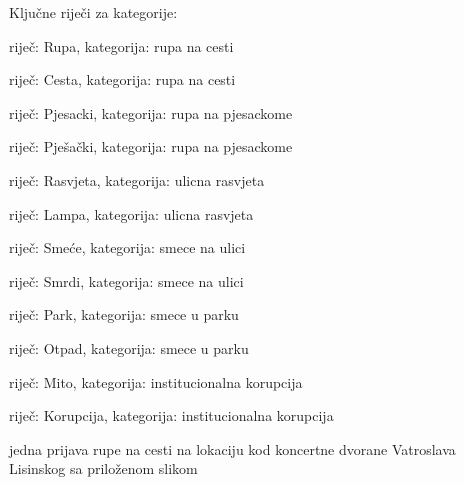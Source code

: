 \begin{packed_item}
\begin{packed_item}
				\end{packed_item}
				\item Ključne riječi za kategorije:
				\begin{packed_item}
					\item riječ: Rupa, kategorija: rupa na cesti
					\item riječ: Cesta, kategorija: rupa na cesti
					\item riječ: Pjesacki, kategorija: rupa na pjesackome
					\item riječ: Pješački, kategorija: rupa na pjesackome
					\item riječ: Rasvjeta, kategorija: ulicna rasvjeta
					\item riječ: Lampa, kategorija: ulicna rasvjeta
					\item riječ: Smeće, kategorija: smece na ulici
					\item riječ: Smrdi, kategorija: smece na ulici
					\item riječ: Park, kategorija: smece u parku
					\item riječ: Otpad, kategorija: smece u parku
					\item riječ: Mito, kategorija: institucionalna korupcija
					\item riječ: Korupcija, kategorija: institucionalna korupcija
				\end{packed_item}
				\item jedna prijava rupe na cesti na lokaciju kod koncertne dvorane Vatroslava Lisinskog sa priloženom slikom
			\end{packed_item}
			
			\eject 